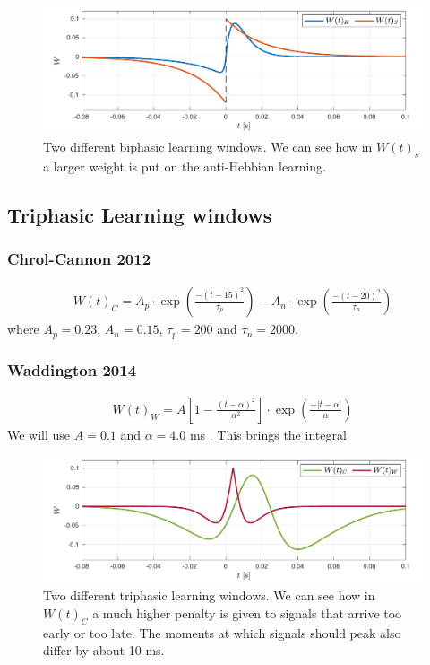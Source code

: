 \begin{figure}[H]
\centering
\includegraphics[width = \textwidth]{../Figures/LearningWindowsBiphasic.pdf}
\caption{Two different biphasic learning windows. We can see how in $W(t)_s$ a larger weight is put on the anti-Hebbian learning.}
\label{fig:LearningWindowsBiphasic}
\end{figure}


\subsection{Triphasic Learning windows}

\subsubsection{Chrol-Cannon 2012}
\begin{align}
W(t)_C = A_{p} \cdot \exp \left(\frac{-\left(t - 15 \right)^{2}}{ \tau_{p}}\right) - A_{n} \cdot \exp \left(\frac{-\left(t - 20\right)^{2}}{ \tau_{n}}\right)  \label{eq:learningwindowChrolCannon2012}
\end{align}
where $A_{p}=0.23$, $A_{n}=0.15$, $\tau_{p}=200$ and $\tau_n = 2000$.

\subsubsection{Waddington 2014}
\begin{align}
W(t)_W =  A \left[1-\frac{\left(t-\alpha\right)^{2}}{\alpha^{2}}\right] \cdot \exp \left(\frac{-\left|t - \alpha\right|}{\alpha}\right) \label{eq:learningwindowWaddington2014}
\end{align}
We will use $A = 0.1$ and $\alpha = 4.0$ ms . This brings the integral 

\begin{figure}[H]
\centering
\includegraphics[width = \textwidth]{../Figures/LearningWindowsTriphasic.pdf}
\caption{Two different triphasic learning windows. We can see how in $W(t)_C$  a much higher penalty is given to signals that arrive too early or too late. The moments at which signals should peak also differ by about 10 ms.}
\label{fig:LearningWindowsTriphasic.pdf}
\end{figure}


